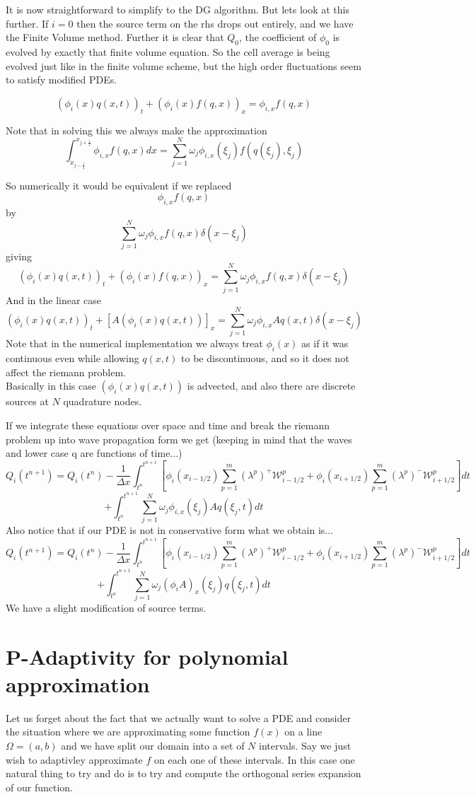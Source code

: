 \documentclass[10]{amsart}
\begin{document}
It is now straightforward to simplify to the DG algorithm. But lets look at this further. If $i=0$ then the source
term on the rhs drops out entirely, and we have the Finite Volume method. Further it is clear that
$Q_0$, the coefficient of $\phi_0$ is evolved by exactly that finite volume equation. So the cell average is
being evolved just like in the finite volume scheme, but the high order fluctuations seem to satisfy modified PDEs.

$$(\phi_i(x)q(x,t))_t+(\phi_i(x)f(q,x))_x=\phi_{i,x}f(q,x)$$

Note that in solving this we always make the approximation $$\int_{x_{j-\frac{1}{2}}}^{x_{j+\frac{1}{2}}} \phi_{i,x}f(q,x)dx
=\sum_{j=1}^N \omega_j\phi_{i,x}(\xi_j)f(q(\xi_j),\xi_j)$$

So numerically it would be equivalent if we replaced 
$$\phi_{i,x}f(q,x)$$ 
by
$$\sum_{j=1}^N \omega_j\phi_{i,x}f(q,x)\delta(x-\xi_j)$$
giving
$$(\phi_i(x)q(x,t))_t+(\phi_i(x)f(q,x))_x=\sum_{j=1}^N \omega_j\phi_{i,x}f(q,x)\delta(x-\xi_j)$$
And in the linear case
$$\left(\phi_i(x)q(x,t)\right)_t+\left[A(\phi_i(x) q(x,t))\right]_x=\sum_{j=1}^N \omega_j\phi_{i,x}A q(x,t)\delta(x-\xi_j)$$
Note that in the numerical implementation we always treat $\phi_i(x)$ as if it was continuous even
while allowing $q(x,t)$ to be discontinuous, and so
it does not affect the riemann problem.
$$$$
Basically in this case $(\phi_i(x) q(x,t))$ is advected, and also there are discrete sources at $N$ quadrature nodes.

If we integrate these equations over space and time and break the riemann problem up into wave propagation form we get
(keeping in mind that the waves and lower case q are functions of time...)
$$Q_i(t^{n+1})=Q_i(t^n)-\frac{1}{\Delta x} \int_{t^n}^{t^{n+1}}[\phi_i(x_{i-1/2})
\sum_{p=1}^m (\lambda^p)^{+} \mathcal{W}^p_{i-1/2}
+\phi_i(x_{i+1/2})\sum_{p=1}^m (\lambda^p)^{-} \mathcal{W}^p_{i+1/2}]dt$$
$$+\int_{t^n}^{t^{n+1}}\sum_{j=1}^N \omega_j\phi_{i,x}(\xi_j)A q(\xi_j,t) dt$$
Also notice that if our PDE is not in conservative form what we obtain is...
$$Q_i(t^{n+1})=Q_i(t^n)-\frac{1}{\Delta x} \int_{t^n}^{t^{n+1}}[\phi_i(x_{i-1/2})
\sum_{p=1}^m (\lambda^p)^{+} \mathcal{W}^p_{i-1/2}
+\phi_i(x_{i+1/2})\sum_{p=1}^m (\lambda^p)^{-} \mathcal{W}^p_{i+1/2}]dt$$
$$+\int_{t^n}^{t^{n+1}}\sum_{j=1}^N \omega_j(\phi_{i}A)_x(\xi_j) q(\xi_j,t) dt$$ 
We have a slight modification of source terms.
\section{P-Adaptivity for polynomial approximation}
Let us forget about the fact that we actually want to solve a PDE and consider the situation where we are approximating
some function $f(x)$ on a line $\Omega=(a,b)$ and we have split our domain into a set of $N$ intervals. Say we just wish
to adaptivley approximate $f$ on each one of these intervals. In this case one natural thing to try and do is to try and
compute the orthogonal series expansion of our function. 
\end{document}
